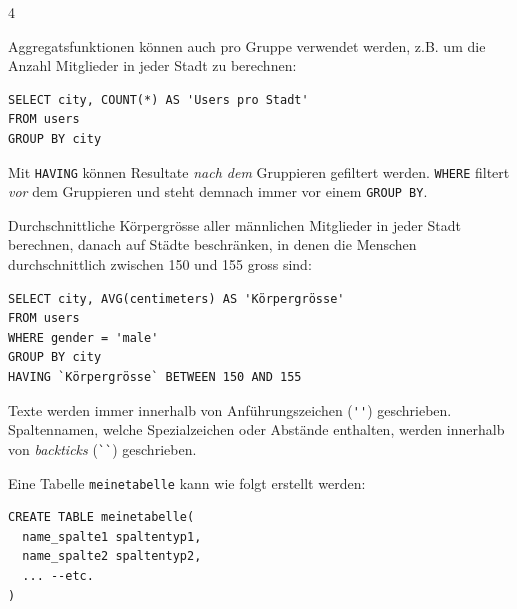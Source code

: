 \begin{landscape}
\begin{multicols*}{4}
\begin{cheatSheetBox}[title=Gruppieren: \texorpdfstring{\lstinline|GROUP BY|}{GROUP BY}]
Aggregatsfunktionen können auch pro Gruppe verwendet werden, z.B. um die Anzahl Mitglieder in jeder Stadt zu berechnen:
\begin{lstlisting}
SELECT city, COUNT(*) AS 'Users pro Stadt'
FROM users
GROUP BY city
\end{lstlisting}
\end{cheatSheetBox}

\begin{cheatSheetBox}[title=Filtern \textit{nach} Gruppieren: \texorpdfstring{\lstinline|HAVING|}{HAVING}]
Mit \lstinline|HAVING| können Resultate \textit{nach dem} Gruppieren gefiltert werden. \lstinline|WHERE| filtert \textit{vor} dem Gruppieren und steht demnach immer vor einem \lstinline|GROUP BY|.

Durchschnittliche Körpergrösse aller männlichen Mitglieder in jeder Stadt berechnen, danach auf Städte beschränken, in denen die Menschen durchschnittlich zwischen 150 und 155 gross sind:
\begin{lstlisting}
SELECT city, AVG(centimeters) AS 'Körpergrösse'
FROM users
WHERE gender = 'male'
GROUP BY city
HAVING `Körpergrösse` BETWEEN 150 AND 155
\end{lstlisting}
\end{cheatSheetBox}
Texte werden immer innerhalb von Anführungszeichen (\lstinline|''|) geschrieben. Spaltennamen, welche Spezialzeichen oder Abstände enthalten, werden innerhalb von \textit{backticks} (\lstinline|``|) geschrieben.

\clearpage
\begin{cheatSheetBox}[title=Tabellen erstellen: \texorpdfstring{\lstinline|CREATE TABLE|}{CREATE TABLE}]
Eine Tabelle \texttt{meinetabelle} kann wie folgt erstellt werden:
\begin{lstlisting}
CREATE TABLE meinetabelle(
  name_spalte1 spaltentyp1,
  name_spalte2 spaltentyp2,
  ... --etc.
)


\end{lstlisting}
\end{cheatSheetBox}
\end{multicols*}
\end{landscape}
